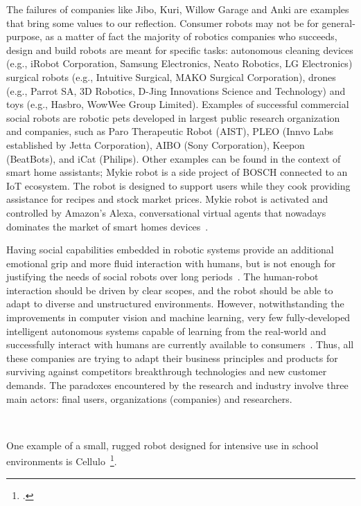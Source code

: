 \documentclass[11pt,a4paper]{report}
\begin{document}
The failures of companies like Jibo, Kuri, Willow Garage and Anki are examples
that bring some values to our reflection. Consumer robots may not be for
general-purpose, as a matter of fact the majority of robotics companies who
succeeds, design and build robots are meant for specific tasks: autonomous
cleaning devices (e.g., iRobot Corporation, Samsung Electronics, Neato Robotics,
LG Electronics) surgical robots (e.g., Intuitive Surgical, MAKO Surgical
Corporation), drones (e.g., Parrot SA, 3D Robotics, D-Jing Innovations Science
and Technology) and toys (e.g., Hasbro, WowWee Group Limited).  Examples of
successful commercial social robots are robotic pets developed in largest public
research organization and companies, such as Paro Therapeutic Robot (AIST), PLEO
(Innvo Labs established by Jetta Corporation), AIBO (Sony Corporation), Keepon
(BeatBots), and iCat (Philips).  Other examples can be found in the context of
smart home assistants; Mykie robot is a side project of BOSCH connected to an
IoT ecosystem. The robot is designed to support users while they cook providing
assistance for recipes and stock market prices. Mykie robot is activated and
controlled by Amazon’s Alexa, conversational virtual agents that nowadays
dominates the market of smart homes devices~\cite{purington2017alexa,
sciuto2018hey}.

Having social capabilities embedded in robotic systems provide an additional
emotional grip and more fluid interaction with humans, but is not enough for
justifying the needs of social robots over long periods~\cite{leite2013social,
baraka2019extended}. The human-robot interaction should be driven by clear
scopes, and the robot should be able to adapt to diverse and unstructured
environments. However, notwithstanding the improvements in computer vision and
machine learning, very few fully-developed intelligent autonomous systems
capable of learning from the real-world and successfully interact with humans
are currently available to consumers~\cite{dereshev2019longterm}. Thus, all
these companies are trying to adapt their business principles and products for
surviving against competitors breakthrough technologies and new customer
demands. The paradoxes encountered by the research and industry involve three
main actors: final users, organizations (companies) and researchers.

~\cite{tulli2019great}
~\cite{hoffman2019anki}

One example of a small, rugged robot designed for intensive use in school
environments is Cellulo~\footcite{ozgur2017cellulo}.
\end{document}
